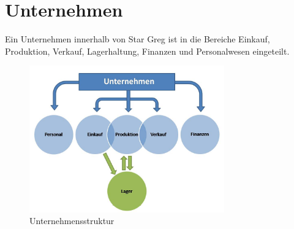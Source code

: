 \section{Unternehmen}
\label{sec:spielwelt-unternehmen}


Ein Unternehmen innerhalb von Star Greg ist in die Bereiche Einkauf, Produktion, Verkauf, Lagerhaltung, Finanzen und Personalwesen eingeteilt. 

\begin{figure}[ht]
\centering
\includegraphics[width=0.75\textwidth]{20_Spielwelt/20_Unternehmen/Unternehmensstruktur.jpg}
\caption{Unternehmensstruktur}
\end{figure}

